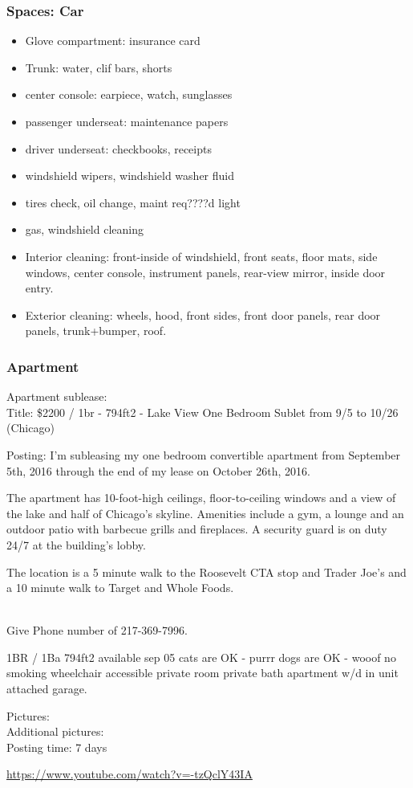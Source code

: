 \begin{frame}[label=spacescar]
  \frametitle{Spaces: Car}
  \begin{itemize}
    \tiny \item \tiny Glove compartment: insurance card
  \item \tiny Trunk: water, clif bars, shorts
  \item \tiny center console: earpiece, watch, sunglasses
  \item \tiny passenger underseat: maintenance papers
  \item \tiny driver underseat: checkbooks, receipts
  \item \tiny windshield wipers, windshield washer fluid
  \item \tiny tires check, oil change, maint req????d light
  \item \tiny gas, windshield cleaning 
  \item \tiny Interior cleaning: front-inside of windshield, front seats, floor
    mats, side windows, center console, instrument panels, rear-view
    mirror, inside door entry. 
  \item \tiny Exterior cleaning: wheels, hood, front sides, front door panels,
    rear door panels, trunk+bumper, roof.  
  \end{itemize}
\end{frame}




\begin{frame} 
\frametitle{ Apartment}

{\tiny Apartment sublease: }\\

{\tiny Title: \$2200 / 1br - 794ft2 - Lake View One Bedroom Sublet from 9/5
to 10/26 (Chicago) } \\

{\tiny Posting: I'm subleasing my one bedroom convertible apartment
  from September 5th, 2016 through the end of my lease on October 26th, 2016.

 The apartment has 10-foot-high ceilings, floor-to-ceiling windows and
a view of the lake and half of Chicago's skyline. Amenities include a
gym, a lounge and an outdoor patio with barbecue grills and
fireplaces. A security guard is on duty 24/7 at the building's lobby.

The location is a 5 minute walk to the Roosevelt CTA stop and Trader
Joe's and a 10 minute walk to Target and Whole Foods. } \\

Give Phone number of 217-369-7996. 

1BR / 1Ba 794ft2 available sep 05 
cats are OK - purrr
dogs are OK - wooof
no smoking
wheelchair accessible
private room
private bath
apartment
w/d in unit
attached garage. 

Pictures:  \\


Additional pictures: \\


Posting time: 7 days

\url{https://www.youtube.com/watch?v=-tzQclY43IA}

\end{frame}


